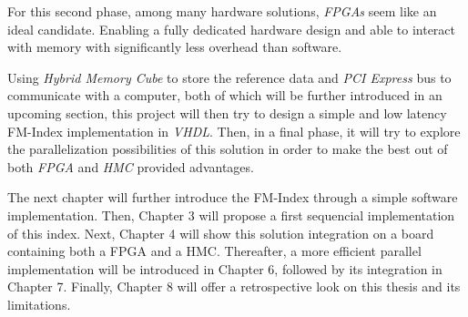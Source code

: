  For this second phase, among many hardware solutions, \textsl{FPGAs} seem like an ideal candidate. Enabling a fully dedicated hardware design and able to interact with memory with significantly less overhead than software.

Using \textsl{Hybrid Memory Cube} to store the reference data and \textsl{PCI Express} bus to communicate with a computer, both of which will be further introduced in an upcoming section, this project will then try to design a simple and low latency FM-Index implementation in \textsl{VHDL}. Then, in a final phase, it will try to explore the parallelization possibilities of this solution in order to make the best out of both \textsl{FPGA} and \textsl{HMC} provided advantages.

The next chapter will further introduce the FM-Index through a simple software implementation. Then, Chapter 3 will propose a first sequencial implementation of this index. Next, Chapter 4 will show this solution integration on a board containing both a FPGA and a HMC. Thereafter, a more efficient parallel implementation will be introduced in Chapter 6, followed by its integration in Chapter 7. Finally, Chapter 8 will offer a retrospective look on this thesis and its limitations.